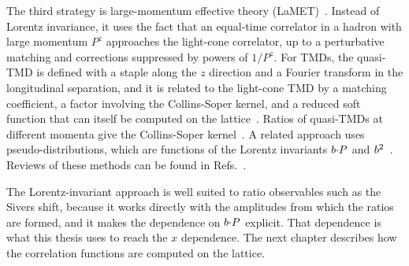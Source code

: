 The third strategy is large-momentum effective theory (LaMET)~\cite{Ji:2013dva,Ji:2020ect}. Instead of Lorentz invariance, it uses the fact that an equal-time correlator in a hadron with large momentum $P^z$ approaches the light-cone correlator, up to a perturbative matching and corrections suppressed by powers of $1/P^z$. For TMDs, the quasi-TMD is defined with a staple along the $z$ direction and a Fourier transform in the longitudinal separation, and it is related to the light-cone TMD by a matching coefficient, a factor involving the Collins-Soper kernel, and a reduced soft function that can itself be computed on the lattice~\cite{Ji:2014hxa,Ebert:2018gzl,Ji:2019sxk,Ebert:2022fmh}. Ratios of quasi-TMDs at different momenta give the Collins-Soper kernel~\cite{Ebert:2018gzl,Shanahan:2021tst,LatticePartonLPC:2022eev}. A related approach uses pseudo-distributions, which are functions of the Lorentz invariants $b{\cdot} P$ and $b^2$~\cite{Radyushkin:2017cyf}. Reviews of these methods can be found in Refs.~\cite{Lin:2017snn,Constantinou:2020hdm,Boussarie:2023izj}.

The Lorentz-invariant approach is well suited to ratio observables such as the Sivers shift, because it works directly with the amplitudes from which the ratios are formed, and it makes the dependence on $b{\cdot} P$ explicit. That dependence is what this thesis uses to reach the $x$ dependence. The next chapter describes how the correlation functions are computed on the lattice.
